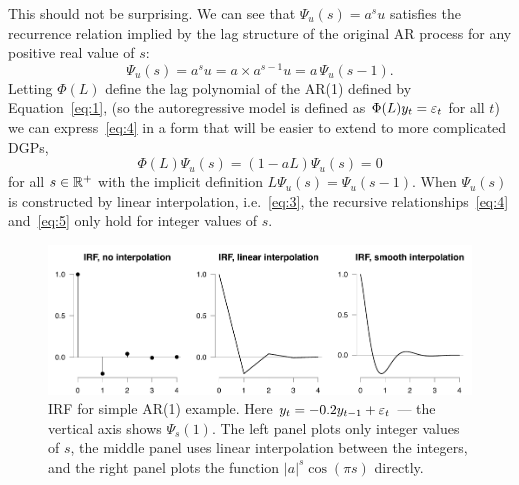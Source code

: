 \documentclass[12pt,fleqn]{article}
\begin{document}
This should not be surprising. We can see that $\Psi_u(s) = a^s u$
satisfies the recurrence relation implied by the lag structure of the
original AR process for any positive real value of $s$:
\begin{equation}
  \label{eq:4}
  \Psi_u(s) = a^s u = a \times a^{s-1} u = a \, \Psi_u(s-1).
\end{equation}
Letting $\Phi(L)$ define the lag polynomial of the AR(1) defined by
Equation~\eqref{eq:1}, (so the autoregressive model is defined as
$\Phi(L)y_t = \varepsilon_t$ for all $t$) we can express~\eqref{eq:4} in a
form that will be easier to extend to more complicated DGPs,
\begin{equation}
  \label{eq:5}
  \Phi(L) \Psi_u(s) = (1 - a L) \Psi_{u}(s) = 0
\end{equation}
for all $s \in \mathbb{R}^+$ with the implicit definition
$L \Psi_u(s) = \Psi_u(s-1)$. When $\Psi_u(s)$ is constructed by linear
interpolation, i.e.~\eqref{eq:3}, the recursive
relationships~\eqref{eq:4} and~\eqref{eq:5} only hold for integer
values of $s$.

\begin{figure}[t]
  \centering
  \includegraphics[width=6.5in]{graphs/motivation2.pdf}
  \caption{IRF for simple AR(1) example. Here $y_t = -0.2 y_{t-1} +
    \varepsilon_t$ --- the vertical axis shows $\Psi_s(1)$. The left panel
    plots only integer values of $s$, the middle panel uses linear
    interpolation between the integers, and the right panel plots the
    function $|a|^s \cos(\pi s)$ directly.}
  \label{fig:2}
\end{figure}
\end{document}

